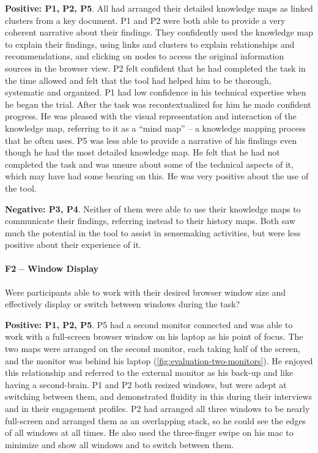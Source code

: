 \textbf{Positive: P1, P2, P5}. All had arranged their detailed knowledge maps as linked clusters from a key document. P1 and P2 were both able to provide a very coherent narrative about their findings. They confidently used the knowledge map to explain their findings, using links and clusters to explain relationships and recommendations, and clicking on nodes to access the original information sources in the browser view. P2 felt confident that he had completed the task in the time allowed and felt that the tool had helped him to be thorough, systematic and organized. P1 had low confidence in his technical expertise when he began the trial. After the task was recontextualized for him he made confident progress. He was pleased with the visual representation and interaction of the knowledge map, referring to it as a ``mind map'' -- a knowledge mapping process that he often uses. P5 was less able to provide a narrative of his findings even though he had the most detailed knowledge map. He felt that he had not completed the task and was unsure about some of the technical aspects of it, which may have had some bearing on this. He was very positive about the use of the tool.

\textbf{Negative: P3, P4}. Neither of them were able to use their knowledge maps to communicate their findings, referring instead to their history maps. Both saw much the potential in the tool to assist in sensemaking activities, but were less positive about their experience of it.

\paragraph{F2 -- Window Display}
Were participants able to work with their desired browser window size and effectively display or switch between windows during the task?

\textbf{Positive: P1, P2, P5}. P5 had a second monitor connected and was able to work with a full-screen browser window on his laptop as his point of focus. The two maps were arranged on the second monitor, each taking half of the screen, and the monitor was behind his laptop (\autoref{fig:evaluation-two-monitors}). He enjoyed this relationship and referred to the external monitor as his back-up and like having a second-brain. P1 and P2 both resized windows, but were adept at switching between them, and demonstrated fluidity in this during their interviews and in their engagement profiles. P2 had arranged all three windows to be nearly full-screen and arranged them as an overlapping stack, so he could see the edges of all windows at all times. He also used the three-finger swipe on his mac to minimize and show all windows and to switch between them.

